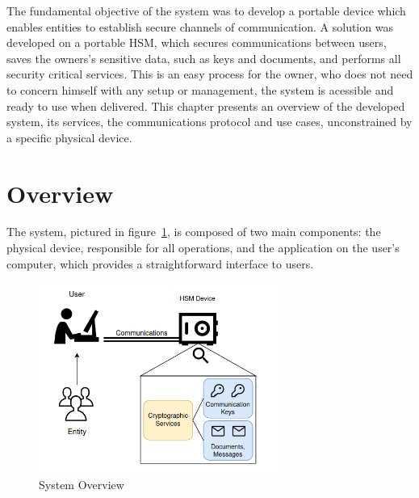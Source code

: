 \cleardoublepage
\label{chap:arch}

The fundamental objective of the system was to develop a portable device which enables entities to establish secure channels of communication.
A solution was developed on a portable \ac{HSM}, which secures communications between users, saves the owners's sensitive data, such as keys and documents, and performs all security critical services. This is an easy process for the owner, who does not need to concern himself with any setup or management, the system is acessible and ready to use when delivered.
This chapter presents an overview of the developed system, its services, the communications protocol and use cases, unconstrained by a specific physical device.


\section{Overview}\label{chap:arch:overview}

The system, pictured in figure~\ref{fig:overview}, is composed of two main components: the physical device, responsible for all operations, and the application on the user's computer, which provides a straightforward interface to users.

\begin{figure}[h]
    \centering
    \includegraphics[width=0.7\textwidth]{./Images/overview.png}
    \caption{System Overview}
    \label{fig:overview}
\end{figure}

